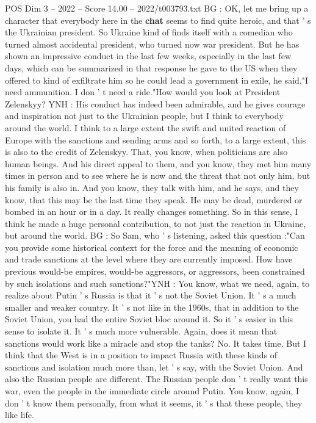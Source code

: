 \begin{textsample}{POS Dim 3 – 2022 – Score 14.00 – 2022/t003793.txt}
BG : OK, let me bring up a character that everybody here in the \textbf{chat} seems to find quite heroic, and that ' s the Ukrainian president.
So Ukraine kind of finds itself with a comedian who turned almost accidental president, who turned now war president.
But he has shown an impressive conduct in the last few weeks, especially in the last few days, which can be summarized in that response he gave to the US when they offered to kind of exfiltrate him so he could lead a government in exile, he said,"I need ammunition.
I don ' t need a ride."How would you look at President Zelenskyy?
YNH : His conduct has indeed been admirable, and he gives courage and inspiration not just to the Ukrainian people, but I think to everybody around the world.
I think to a large extent the swift and united reaction of Europe with the sanctions and sending arms and so forth, to a large extent, this is also to the credit of Zelenskyy.
That, you know, when politicians are also human beings.
And his direct appeal to them, and you know, they met him many times in person and to see where he is now and the threat that not only him, but his family is also in.
And you know, they talk with him, and he says, and they know, that this may be the last time they speak.
He may be dead, murdered or bombed in an hour or in a day.
It really changes something.
So in this sense, I think he made a huge personal contribution, to not just the reaction in Ukraine, but around the world.
BG : So Sam, who ' s listening, asked this question :"Can you provide some historical context for the force and the meaning of economic and trade sanctions at the level where they are currently imposed.
How have previous would-be empires, would-be aggressors, or aggressors, been constrained by such isolations and such sanctions?"YNH : You know, what we need, again, to realize about Putin ' s Russia is that it ' s not the Soviet Union.
It ' s a much smaller and weaker country.
It ' s not like in the 1960s, that in addition to the Soviet Union, you had the entire Soviet bloc around it.
So it ' s easier in this sense to isolate it.
It ' s much more vulnerable.
Again, does it mean that sanctions would work like a miracle and stop the tanks?
No.
It takes time.
But I think that the West is in a position to impact Russia with these kinds of sanctions and isolation much more than, let ' s say, with the Soviet Union.
And also the Russian people are different.
The Russian people don ' t really want this war, even the people in the immediate circle around Putin.
You know, again, I don ' t know them personally, from what it seems, it ' s that these people, they like life.

\end{textsample}
